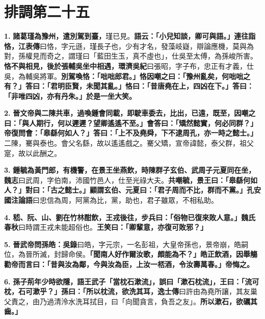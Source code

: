 \chapter{排調第二十五}

\textbf{1.} \textbf{諸葛瑾為豫州，遣別駕到臺，}{\footnotesize 瑾已見。}\textbf{語云：「小兒知談，卿可與語。」連往詣恪，}{\footnotesize \textbf{江表傳}曰恪，字元遜，瑾長子也，少有才名，發藻岐嶷，辯論應機，莫與為對，孫權見而奇之，謂瑾曰「藍田生玉，真不虛也」，仕吳至太傅，為孫峻所害。}\textbf{恪不與相見，後於張輔吳坐中相遇，}{\footnotesize \textbf{環濟吳紀}曰張昭，字子布，忠正有才義，仕吳，為輔吳將軍。}\textbf{別駕喚恪：「咄咄郎君。」恪因嘲之曰：「豫州亂矣，何咄咄之有？」答曰：「君明臣賢，未聞其亂。」恪曰：「昔唐堯在上，四凶在下。」答曰：「非唯四凶，亦有丹朱。」於是一坐大笑。}

\textbf{2.} \textbf{晉文帝與二陳共車，過喚鍾會同載，即駛車委去，比出，已遠，既至，因嘲之曰：「與人期行，何以遲遲？望卿遙遙不至。」會答曰：「矯然懿實，何必同群？」帝復問會：「皋繇何如人？」答曰：「上不及堯舜，下不逮周孔，亦一時之懿士。」}{\footnotesize 二陳，騫與泰也。會父名繇，故以遙遙戲之。騫父矯，宣帝諱懿，泰父群，祖父寔，故以此酬之。}

\textbf{3.} \textbf{鍾毓為黃門郎，有機警，在景王坐燕飲，時陳群子玄伯、武周子元夏同在坐，}{\footnotesize \textbf{魏志}曰武周，字伯南，沛國竹邑人，仕至光祿大夫。}\textbf{共嘲毓，景王曰：「皋繇何如人？」對曰：「古之懿士。」顧謂玄伯、元夏曰：「君子周而不比，群而不黨。」}{\footnotesize \textbf{孔安國注論語}曰忠信為周，阿黨為比，黨，助也，君子雖眾，不相私助。}

\textbf{4.} \textbf{嵇、阮、山、劉在竹林酣飲，王戎後往，步兵曰：「俗物已復來敗人意。」}{\footnotesize \textbf{魏氏春秋}曰時謂王戎未能超俗也。}\textbf{王笑曰：「卿輩意，亦復可敗邪？」}

\textbf{5.} \textbf{晉武帝問孫皓：}{\footnotesize \textbf{吳錄}曰皓，字元宗，一名彭祖，大皇帝孫也，景帝崩，皓嗣位，為晉所滅，封歸命侯。}\textbf{「聞南人好作爾汝歌，頗能為不？」皓正飲酒，因舉觴勸帝而言曰：「昔與汝為鄰，今與汝為臣，上汝一桮酒，令汝壽萬春。」帝悔之。}

\textbf{6.} \textbf{孫子荊年少時欲隱，語王武子「當枕石漱流」，誤曰「漱石枕流」，王曰：「流可枕，石可漱乎？」孫曰：「所以枕流，欲洗其耳，}{\footnotesize \textbf{逸士傳}曰許由為堯所讓，其友巢父責之，由乃過清泠水洗耳拭目，曰「向聞貪言，負吾之友」。}\textbf{所以漱石，欲礪其齒。」}


